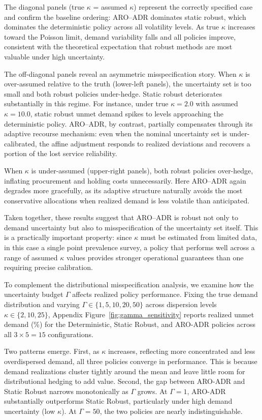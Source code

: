 \documentclass{article}
\begin{document}
The diagonal panels (true $\kappa$ = assumed $\kappa$) represent the correctly specified case and confirm the baseline ordering: ARO--ADR dominates static robust, which dominates the deterministic policy across all volatility levels. As true $\kappa$ increases toward the Poisson limit, demand variability falls and all policies improve, consistent with the theoretical expectation that robust methods are most valuable under high uncertainty.

The off-diagonal panels reveal an asymmetric misspecification story. When $\kappa$ is over-assumed relative to the truth (lower-left panels), the uncertainty set is too small and both robust policies under-hedge. Static robust deteriorates substantially in this regime. For instance, under true $\kappa = 2.0$ with assumed $\kappa = 10.0$, static robust unmet demand spikes to levels approaching the deterministic policy. ARO--ADR, by contrast, partially compensates through its adaptive recourse mechanism: even when the nominal uncertainty set is under-calibrated, the affine adjustment responds to realized deviations and recovers a portion of the lost service reliability.

When $\kappa$ is under-assumed (upper-right panels), both robust policies over-hedge, inflating procurement and holding costs unnecessarily. Here ARO--ADR again degrades more gracefully, as its adaptive structure naturally avoids the most conservative allocations when realized demand is less volatile than anticipated.

Taken together, these results suggest that ARO--ADR is robust not only to demand uncertainty but also to misspecification of the uncertainty set itself. This is a practically important property: since $\kappa$ must be estimated from limited data, in this case a single point prevalence survey, a policy that performs well across a range of assumed $\kappa$ values provides stronger operational guarantees than one requiring precise calibration.

To complement the distributional misspecification analysis, we examine how the uncertainty budget $\Gamma$ affects realized policy performance. Fixing the true demand distribution and varying $\Gamma \in \{1, 5, 10, 20, 50\}$ across dispersion levels $\kappa \in \{2, 10, 25\}$, Appendix Figure~\ref{fig:gamma_sensitivity} reports realized unmet demand (\%) for the Deterministic, Static Robust, and ARO-ADR policies across all $3 \times 5 = 15$ configurations.

Two patterns emerge. First, as $\kappa$ increases, reflecting more concentrated and less overdispersed demand, all three policies converge in performance. This is because  demand realizations cluster tightly around the mean and leave little room for distributional hedging to add value. Second, the gap between ARO-ADR and Static Robust narrows monotonically as $\Gamma$ grows. At $\Gamma = 1$, ARO-ADR substantially outperforms Static Robust, particularly under high demand uncertainty (low $\kappa$). At $\Gamma = 50$, the two policies are nearly indistinguishable.
\end{document}
